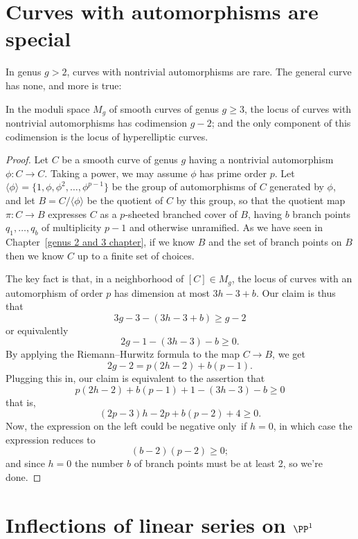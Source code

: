 \section{Curves with automorphisms are special}\label{curves with
automorphisms}

In genus $g > 2$, curves with nontrivial automorphisms are rare. The
general curve has none, and more is true:

\begin{lemma}
In the moduli space $M_g$ of smooth curves of genus $g \geq 3$, the
%
locus of curves with nontrivial automorphisms has codimension $g-2$;
and the only component of this codimension is the locus
of hyperelliptic curves.
\end{lemma}

\begin{proof}
Let $C$ be a smooth curve of genus $g$
having a nontrivial
automorphism $\phi : C \to C$. Taking a power, we may assume $\phi$
has prime order $p$.
Let $\langle \phi \rangle = \{1, \phi, \phi^2,\dots,\phi^{p-1} \}$
be the group of automorphisms of $C$ generated by $\phi$, and let $B =
C/\langle \phi \rangle $ be the quotient of $C$ by this group, so that
the quotient map $\pi : C \to B$ expresses $C$ as a $p$-sheeted branched
cover of $B$, having $b$ branch points $q_1,\dots, q_b$ of multiplicity
$p-1$ and otherwise unramified.
As we have seen in Chapter~\ref{genus 2 and 3 chapter}, if we know $B$
and the set
of branch points on $B$ then we know $C$ up to a finite set of choices.

The
key fact is that,
in a neighborhood of $[C] \in M_g$, the locus of curves
with an automorphism of order $p$ has dimension at most $3h-3 + b$. Our
claim is thus that
$$
3g-3 - (3h-3+b) \geq g-2
$$
or equivalently
$$
2g - 1 - (3h-3) - b \geq 0.
$$
By applying the Riemann--Hurwitz formula to the map $C \to B$, we get
$$
2g-2 = p(2h-2) + b(p-1).
$$
Plugging this in, our claim is equivalent to the assertion that
$$
p(2h-2) + b(p-1) + 1 - (3h-3) - b \geq 0
$$
that is,
$$
(2p-3)h -2p + b(p-2) + 4 \geq 0.
$$
Now, the expression on the left could be negative only~if $h=0$, in
which case the expression reduces to
$$
(b-2)(p-2) \geq 0;
$$
and since $h=0$ the number $b$ of branch points must be at least 2,
so we're done.
\end{proof}

\section{Inflections of linear series on $\PP^1$}

